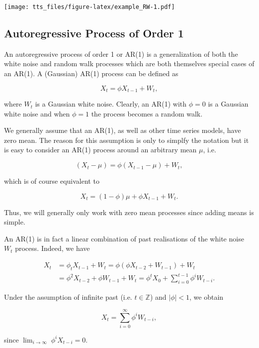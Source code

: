 \documentclass[]{book}
\theoremstyle{definition}
\theoremstyle{definition}
\theoremstyle{definition}
\theoremstyle{remark}
\let\BeginKnitrBlock\begin \let\EndKnitrBlock\end
\begin{document}
\texttt{[image: tts\_files/figure-latex/example\_RW-1.pdf]}

\hypertarget{ar1}{%
\subsection{Autoregressive Process of Order 1}\label{ar1}}

An autoregressive process of order 1 or AR(1) is a generalization of
both the white noise and random walk processes which are both themselves
special cases of an AR(1). A (Gaussian) AR(1) process can be defined as

\[{X_t} = {\phi}{X_{t - 1}} + {W_t},\]

where \(W_t\) is a Gaussian white noise. Clearly, an AR(1) with
\(\phi = 0\) is a Gaussian white noise and when \(\phi = 1\) the process
becomes a random walk.

\BeginKnitrBlock{remark}
{}We generally assume that an AR(1), as well as
other time series models, have zero mean. The reason for this assumption
is only to simplfy the notation but it is easy to consider an AR(1)
process around an arbitrary mean \(\mu\), i.e.

\[\left(X_t - \mu\right) = \phi \left(X_{t-1} - \mu \right) + W_t,\]

which is of course equivalent to

\[X_t = \left(1 - \phi \right) \mu + \phi X_{t-1} + W_t.\]

Thus, we will generally only work with zero mean processes since adding
means is simple.
\EndKnitrBlock{remark}

\BeginKnitrBlock{remark}
{}An AR(1) is in fact a linear combination of
past realisations of the white noise \(W_t\) process. Indeed, we have

\[\begin{aligned}
 {X_t} &= {\phi_t}{X_{t - 1}} + {W_t} 
   = {\phi}\left( {{\phi}{X_{t - 2}} + {W_{t - 1}}} \right) + {W_t} \\
   &= \phi^2{X_{t - 2}} + {\phi}{W_{t - 1}} + {W_t} 
   = {\phi^t}{X_0} + \sum\limits_{i = 0}^{t - 1} {\phi^i{W_{t - i}}}.
\end{aligned}\]

Under the assumption of infinite past (i.e. \(t \in \mathbb{Z}\)) and
\(|\phi| < 1\), we obtain

\[X_t = \sum\limits_{i = 0}^{\infty} {\phi^i {W_{t - i}}},\]

since \(\operatorname{lim}_{i \to \infty} \; {\phi^i}{X_{t-i}} = 0\).
\EndKnitrBlock{remark}
\end{document}
